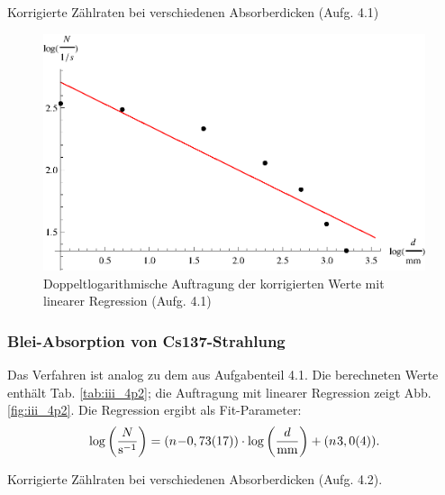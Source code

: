 \begin{table}[tb]
	\centering
	\caption{Korrigierte Zählraten bei verschiedenen Absorberdicken (Aufg. 4.1)}
	\label{tab:iii_4p1}
	
\end{table}

\begin{figure}[tb]
	\centering
	\includegraphics[scale=1.0]{fig/iii_4p1.eps}
	\caption{Doppeltlogarithmische Auftragung der korrigierten Werte mit linearer Regression (Aufg. 4.1)}
	\label{fig:iii_4p1}
\end{figure}

\subsubsection{Blei-Absorption von Cs137-Strahlung}
Das Verfahren ist analog zu dem aus Aufgabenteil 4.1. Die berechneten Werte enthält Tab. \ref{tab:iii_4p2}; die Auftragung mit linearer Regression zeigt Abb. \ref{fig:iii_4p2}. Die Regression ergibt als Fit-Parameter:
\begin{equation}
\log\left(\frac{N}{\si{\per\second}}\right) = (\numb{-0,73(17)}) \cdot \log\left(\frac{d}{\si{mm}}\right) + (\numb{3,0(4)}).
\end{equation}

\begin{table}[tb]
	\centering
	\caption{Korrigierte Zählraten bei verschiedenen Absorberdicken (Aufg. 4.2).}
	\label{tab:iii_4p2}
	
\end{table}

